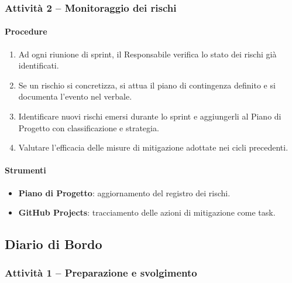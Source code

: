 \documentclass[a4paper, 11pt, oneside]{scrartcl}
\begin{document}
\subsubsection{Attività 2 – Monitoraggio dei rischi}

\paragraph{Procedure}
\begin{enumerate}
    \item Ad ogni riunione di sprint, il Responsabile verifica lo stato dei rischi già identificati.
    \item Se un rischio si concretizza, si attua il piano di contingenza definito e si documenta l'evento nel verbale.
    \item Identificare nuovi rischi emersi durante lo sprint e aggiungerli al Piano di Progetto con classificazione e strategia.
    \item Valutare l'efficacia delle misure di mitigazione adottate nei cicli precedenti.
\end{enumerate}

\paragraph{Strumenti}
\begin{itemize}
    \item \textbf{Piano di Progetto}: aggiornamento del registro dei rischi.
    \item \textbf{GitHub Projects}: tracciamento delle azioni di mitigazione come task.
\end{itemize}

\subsection{Diario di Bordo}

\subsubsection{Attività 1 – Preparazione e svolgimento}
\end{document}
